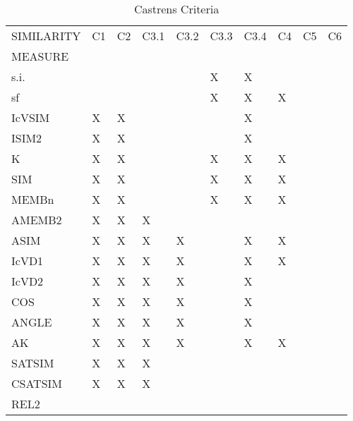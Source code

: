 \documentclass{article}
\begin{document}
\begin{table}[htb]
\caption{Castrens Criteria} 
\begin{center}
\begin{tabular}{llllllllll}
\hline
 SIMILARITY  &  C1  &  C2  &  C3.1  &  C3.2  &  C3.3  &  C3.4  &  C4  &  C5  &  C6  \\
 MEASURE     &      &      &        &        &        &        &      &      &      \\
\hline
 s.i.        &      &      &        &        &  X     &  X     &      &      &      \\
 sf          &      &      &        &        &  X     &  X     &  X   &      &      \\
 IcVSIM      &  X   &  X   &        &        &        &  X     &      &      &      \\
 ISIM2       &  X   &  X   &        &        &        &  X     &      &      &      \\
 K           &  X   &  X   &        &        &  X     &  X     &  X   &      &      \\
 SIM         &  X   &  X   &        &        &  X     &  X     &  X   &      &      \\
 MEMBn       &  X   &  X   &        &        &  X     &  X     &  X   &      &      \\
 AMEMB2      &  X   &  X   &  X     &        &        &        &      &      &      \\
 ASIM        &  X   &  X   &  X     &  X     &        &  X     &  X   &      &      \\
 IcVD1       &  X   &  X   &  X     &  X     &        &  X     &  X   &      &      \\
 IcVD2       &  X   &  X   &  X     &  X     &        &  X     &      &      &      \\
 COS         &  X   &  X   &  X     &  X     &        &  X     &      &      &      \\
 ANGLE       &  X   &  X   &  X     &  X     &        &  X     &      &      &      \\
 AK          &  X   &  X   &  X     &  X     &        &  X     &  X   &      &      \\
 SATSIM      &  X   &  X   &  X     &        &        &        &      &      &      \\
 CSATSIM     &  X   &  X   &  X     &        &        &        &      &      &      \\
 REL2        &      &      &        &        &        &        &      &      &      \\

\end{tabular}
\end{center}
\end{table}
\end{document}
